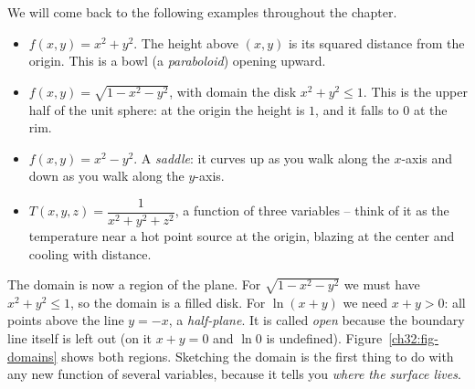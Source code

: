 We will come back to the following examples throughout the chapter.

\begin{example}
\label{ch32:ex-zoo}
\begin{itemize}
  \item $f(x,y) = x^2 + y^2$. The height above $(x,y)$ is its squared distance from the
  origin. This is a bowl (a \emph{paraboloid}) opening upward.
  \item $f(x,y) = \sqrt{1 - x^2 - y^2}$, with domain the disk $x^2+y^2 \le 1$. This is the
  upper half of the unit sphere: at the origin the height is $1$, and it falls to $0$ at the
  rim.
  \item $f(x,y) = x^2 - y^2$. A \emph{saddle}: it curves up as you walk along the $x$-axis
  and down as you walk along the $y$-axis.
  \item $T(x,y,z) = \dfrac{1}{x^2+y^2+z^2}$, a function of three variables -- think of it as
  the temperature near a hot point source at the origin, blazing at the center and cooling
  with distance.
\end{itemize}
\end{example}

The domain is now a region of the plane. For $\sqrt{1-x^2-y^2}$ we must
have $x^2+y^2 \le 1$, so the domain is a filled disk. For $\ln(x+y)$ we need $x+y>0$: all
points above the line $y=-x$, a \emph{half-plane}. It is called \emph{open} because the
boundary line itself is left out (on it $x+y=0$ and $\ln 0$ is undefined).
Figure~\ref{ch32:fig-domains} shows both regions. Sketching the domain is the first thing to do
with any new function of several variables, because it tells you \emph{where the surface lives}.

